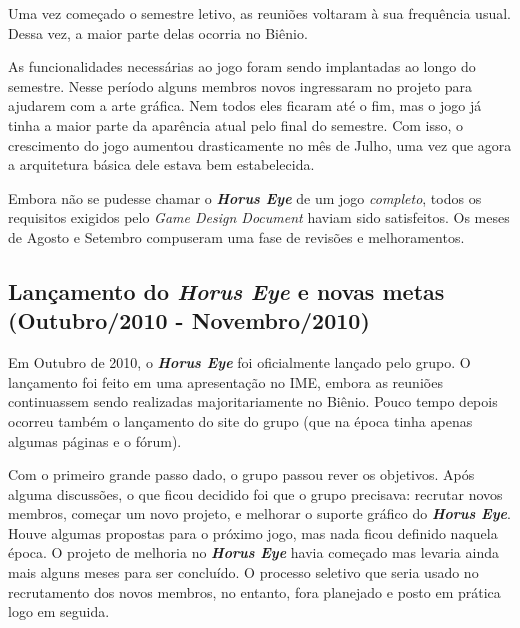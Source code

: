 \documentclass[12pt,onecolumn,a4paper]{article}
\begin{document}
        Uma vez começado o semestre letivo, as reuniões voltaram à sua frequência usual. Dessa vez,
        a maior parte delas ocorria no Biênio.
        
        As funcionalidades necessárias ao jogo foram sendo implantadas ao longo do semestre. Nesse
        período alguns membros novos ingressaram no projeto para ajudarem com a arte gráfica. Nem
        todos eles ficaram até o fim, mas o jogo já tinha a maior parte da aparência atual pelo
        final do semestre. Com isso, o crescimento do jogo aumentou drasticamente no mês de Julho,
        uma vez que agora a arquitetura básica dele estava bem estabelecida.
        
        Embora não se pudesse chamar o \textit{\textbf{Horus Eye}} de um jogo \textit{completo},
        todos os requisitos exigidos pelo \textit{Game Design Document} haviam sido satisfeitos. Os
        meses de Agosto e Setembro compuseram uma fase de revisões e melhoramentos.

    \clearpage
    \subsection{Lançamento do \textit{\textbf{Horus Eye}} e novas metas \\
                {\small(Outubro/2010 - Novembro/2010)} }
        Em Outubro de 2010, o \textit{\textbf{Horus Eye}} foi oficialmente lançado pelo grupo. O
        lançamento foi feito em uma apresentação no IME, embora as reuniões continuassem
        sendo realizadas majoritariamente no Biênio. Pouco tempo depois ocorreu também o lançamento
        do site do grupo (que na época tinha apenas algumas páginas e o fórum).
        
        Com o primeiro grande passo dado, o grupo passou rever os objetivos. Após alguma discussões,
        o que ficou decidido foi que o grupo precisava: recrutar novos membros, começar um novo
        projeto, e melhorar o suporte gráfico do \textit{\textbf{Horus Eye}}. Houve algumas
        propostas para o próximo jogo, mas nada ficou definido naquela época. O projeto de melhoria
        no \textit{\textbf{Horus Eye}} havia começado mas levaria ainda mais alguns meses para ser
        concluído. O processo seletivo que seria usado no recrutamento dos novos membros, no
        entanto, fora planejado e posto em prática logo em seguida.

    \clearpage
\end{document}
